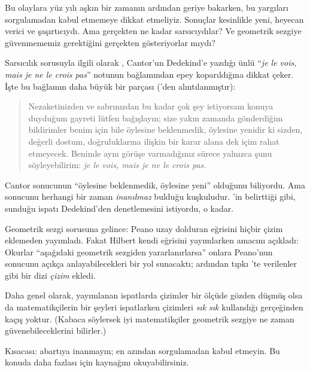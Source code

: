 



Bu olaylara yüz yılı aşkın bir zamanın ardından geriye bakarken, bu yargıları
sorgulamadan kabul etmemeye dikkat etmeliyiz. Sonuçlar kesinlikle yeni,
heyecan verici ve şaşırtıcıydı. Ama gerçekten ne kadar sarsıcıydılar? Ve
geometrik sezgiye güvenmememiz gerektiğini gerçekten gösteriyorlar mıydı?

Sarsıcılık sorusuyla ilgili olarak \citet{Gouvea2011}, Cantor'un Dedekind'e
yazdığı ünlü ``\emph{je le vois, mais je ne le crois pas}'' notunun
bağlamından epey koparıldığına dikkat çeker. İşte bu bağlamın daha büyük bir
parçası (\citeauthor{Gouvea2011}'den alıntılanmıştır):
\begin{quote}
Nezaketinizden ve sabrınızdan bu kadar çok şey istiyorsam konuya duyduğum
gayreti lütfen bağışlayın; size yakın zamanda gönderdiğim bildirimler benim
için bile öylesine beklenmedik, öylesine yenidir ki sizden, değerli dostum,
doğruluklarına ilişkin bir karar alana dek içim rahat etmeyecek. Benimle aynı
görüşe varmadığınız sürece yalnızca şunu söyleyebilirim: \emph{je le vois,
mais je ne le crois pas.}
\end{quote}
Cantor sonucunun ``öylesine beklenmedik, öylesine yeni'' olduğunu biliyordu.
Ama sonucunu herhangi bir zaman \emph{inanılmaz} bulduğu kuşkuludur.
\citeauthor{Gouvea2011}'in belirttiği gibi, sunduğu ispatı Dedekind'den
denetlemesini istiyordu, o kadar.

Geometrik sezgi sorusuna gelince: Peano uzay dolduran eğrisini hiçbir çizim
eklemeden yayımladı. Fakat Hilbert kendi eğrisini yayımlarken amacını açıkladı:
Okurlar ``aşağıdaki geometrik sezgiden yararlanırlarsa'' onlara Peano'nun
sonucunu açıkça anlayabilecekleri bir yol sunacaktı; ardından tıpkı
'te verilenler gibi bir dizi \emph{çizim}
ekledi.

Daha genel olarak, yayımlanan ispatlarda çizimler bir ölçüde gözden düşmüş
olsa da matematikçilerin bir şeyleri ispatlarken çizimleri \emph{sık sık}
kullandığı gerçeğinden kaçış yoktur. (Kabaca söylersek iyi matematikçiler
geometrik sezgiye ne zaman güvenebileceklerini bilirler.)

Kısacası: abartıya inanmayın; en azından sorgulamadan kabul etmeyin. Bu konuda
daha fazlası için \citet{Giaquinto2007} kaynağını okuyabilirsiniz.

